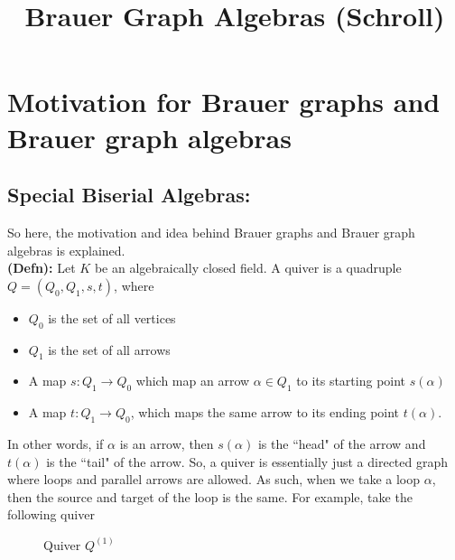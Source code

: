 \documentclass{amsart}
\title{Brauer Graph Algebras (Schroll)}
\numberwithin{figure}{section}
\begin{document}
\maketitle
\section{Motivation for Brauer graphs and Brauer graph algebras}

\subsection{Special Biserial Algebras: }

So here, the motivation and idea behind Brauer graphs and Brauer graph algebras is explained.\\

\textbf{(Defn): }Let $K$ be an algebraically closed field. A quiver is a quadruple $Q=(Q_0,Q_1,s,t)$, where \begin{itemize}
    \item $Q_0$ is the set of all vertices 
    \item $Q_1$ is the set of all arrows
    \item A map $s:Q_1 \to Q_0$ which map an arrow $\alpha \in Q_1$ to its starting point $s(\alpha)$ 
    \item A map $t:Q_1 \to Q_0$, which maps the same arrow to its ending point $t(\alpha)$. 
\end{itemize}
In other words, if $\alpha$ is an arrow, then $s(\alpha)$ is the ``head" of the arrow and $t(\alpha)$ is the ``tail" of the arrow. So, a quiver is essentially just a directed graph where loops and parallel arrows are allowed. As such, when we take a loop $\alpha$, then the source and target of the loop is the same. For example, take the following quiver
\begin{figure}[H]
\centering
{}
\caption{Quiver $Q^{(1)}$}
\label{fig:quiverexample}
\end{figure}
\end{document}
